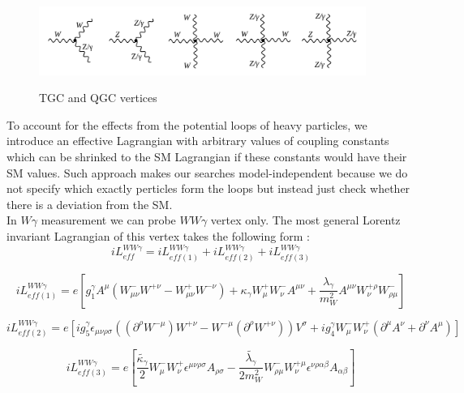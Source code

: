 \begin{figure}[htb]
  \begin{center}
    {\includegraphics[width=0.95\textwidth]{../figs/WgAbout/TGC_and_QGC_vertices.png}}
    \caption{TGC and QGC vertices}
    \label{fig:TGC_and_QGC_vertices}
  \end{center}
\end{figure}

To account for the effects from the potential loops of heavy particles, we introduce an effective Lagrangian with arbitrary values of coupling constants which can be shrinked to the SM Lagrangian if these constants would have their SM values. Such approach makes our searches model-independent because we do not specify which exactly perticles form the loops but instead just check whether there is a deviation from the SM. \\

In $W\gamma$ measurement we can probe $WW\gamma$ vertex only. The most general Lorentz invariant Lagrangian of this vertex takes the following form \cite{ref_theory_aTGC}:\\

\begin{equation}\label{L_ATGC}
i L_{eff}^{WW\gamma}= i L_{eff(1)}^{WW\gamma} + i L_{eff(2)}^{WW\gamma} + i L_{eff(3)}^{WW\gamma}
\end{equation}


\begin{equation}\label{L_ATGC_1}
i L_{eff(1)}^{WW\gamma}= e [ g_1^{\gamma} A^\mu (W_{\mu\nu}^- W^{+\nu} - W_{\mu\nu}^+ W^{-\nu}) + \kappa_\gamma W_{\mu}^+ W_{\nu}^- A^{\mu\nu} + {\frac{\lambda_\gamma}{m^2_W}} A^{\mu\nu} W_\nu^{+\rho} W_{\rho\mu}^- ]
\end{equation}

\begin{equation}\label{L_ATGC_2}
i L_{eff(2)}^{WW\gamma}= e [ i g_5^\gamma \epsilon_{\mu\nu\rho\sigma}((\partial^\rho W^{-\mu})W^{+\nu} - W^{-\mu}(\partial^{\rho}W^{+\nu}))V^\sigma + i g_4^\gamma W_\mu^- W_\nu^+ (\partial^\mu A^\nu + \partial^\nu A^\mu) ]
\end{equation}

\begin{equation}\label{L_ATGC_3}
i L_{eff(3)}^{WW\gamma}= e [ \frac{\tilde{\kappa_\gamma}}{2} W_\mu^- W_\nu^+ \epsilon^{\mu\nu\rho\sigma} A_{\rho\sigma} - \frac{\tilde{\lambda_\gamma}}{2 m_W^2} W_{\rho\mu}^- W^{+\mu}_{\nu} \epsilon^{\nu\rho\alpha\beta} A_{\alpha\beta}]
\end{equation}


